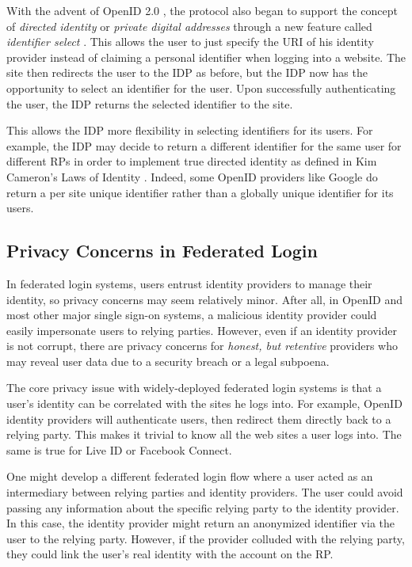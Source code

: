 \documentclass{llncs}
\begin{document}
With the advent of OpenID 2.0 \cite{OID2}, the protocol also began to
support the concept of \emph{directed identity} \cite{Cam06} or
\emph{private digital addresses} through a new feature called
\emph{identifier select} \cite{RR06}.  This allows the user to just
specify the URI of his identity provider instead of claiming a
personal identifier when logging into a website. The site then
redirects the user to the IDP as before, but the IDP now has the
opportunity to select an identifier for the user. Upon successfully
authenticating the user, the IDP returns the selected identifier to
the site.

This allows the IDP more flexibility in selecting identifiers for its
users. For example, the IDP may decide to return a different
identifier for the same user for different RPs in order to implement
true directed identity as defined in Kim Cameron's Laws of Identity
\cite{Cam06}. Indeed, some OpenID providers like Google do return a
per site unique identifier rather than a globally unique identifier
for its users.

\subsection{Privacy Concerns in Federated Login}

In federated login systems, users entrust identity providers to manage
their identity, so privacy concerns may seem relatively minor. After
all, in OpenID and most other major single sign-on systems, a
malicious identity provider could easily impersonate users to relying
parties. However, even if an identity provider is not corrupt, there
are privacy concerns for \emph{honest, but retentive} providers who
may reveal user data due to a security breach or a legal
subpoena.

The core privacy issue with widely-deployed federated login systems
is that a user's identity can be correlated with the sites he logs
into. For example, OpenID identity providers will authenticate users,
then redirect them directly back to a relying party. This makes it
trivial to know all the web sites a user logs into. The same
is true for Live ID or Facebook Connect.

One might develop a different federated login flow where a user acted
as an intermediary between relying parties and identity providers. The
user could avoid passing any information about the specific relying
party to the identity provider. In this case, the identity provider
might return an anonymized identifier via the user to the relying
party. However, if the provider colluded with the relying party, they
could link the user's real identity with the account on the RP.
\end{document}
